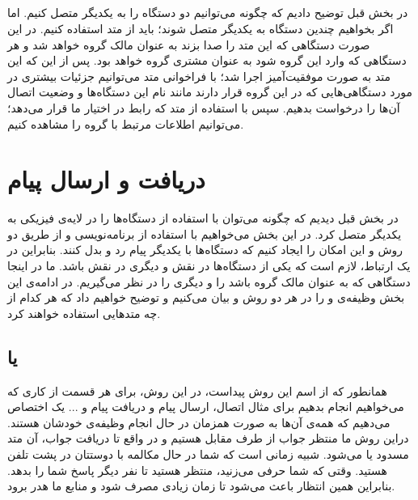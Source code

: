 \subsection{}
در بخش قبل توضیح دادیم که چگونه می‌توانیم دو دستگاه را به یکدیگر متصل کنیم. اما اگر بخواهیم چندین دستگاه به یکدیگر متصل شوند؛ باید از متد 
استفاده کنیم. در این صورت دستگاهی که این متد را صدا بزند به عنوان مالک گروه خواهد شد و هر دستگاهی که وارد این گروه شود به عنوان مشتری گروه خواهد بود. 
پس از این که این متد به صورت موفقیت‌آمیز اجرا شد؛ با فراخوانی متد
می‌توانیم جزئیات بیشتری در مورد دستگاهی‌هایی که در این گروه قرار دارند مانند نام این دستگاه‌ها و وضعیت اتصال آن‌ها را درخواست بدهیم. سپس با استفاده از متد
که رابط 
در اختیار ما قرار می‌دهد؛ می‌توانیم اطلاعات مرتبط با گروه را مشاهده کنیم.
\cite{wifidevelopers}

\section{دریافت و ارسال پیام}
در بخش قبل دیدیم که چگونه می‌توان با استفاده از 
دستگاه‌ها را در لایه‌ی فیزیکی به یکدیگر متصل کرد. در این بخش می‌خواهیم با استفاده از برنامه‌نویسی 
 و از طریق دو روش 
و 
این امکان را ایجاد کنیم که دستگاه‌ها با یکدیگر پیام رد و بدل کنند. بنابراین در یک ارتباط، لازم است که یکی از دستگاه‌ها در نقش
 و دیگری در نقش
 باشد. ما در اینجا دستگاهی که به عنوان مالک گروه باشد را 
و  دیگری را 
 در نظر می‌گیریم. در ادامه‌ی این بخش وظیفه‌ی 
و
را در هر دو روش
و 
بیان می‌کنیم و توضیح خواهیم داد که هر کدام از چه متد‌هایی استفاده خواهند کرد.
\subsection{ یا }
همانطور که از اسم این روش پیداست، در این روش، برای هر قسمت از  کاری که می‌خواهیم انجام بدهیم برای مثال اتصال، ارسال پیام و دریافت پیام و ... یک 
اختصاص می‌دهیم که همه‌ی آن‌ها به صورت همزمان در حال انجام وظیفه‌ی خودشان هستند. 
دراین روش  ما منتظر جواب از طرف مقابل هستیم و در واقع تا دریافت جواب، آن متد مسدود یا 
می‌شود. شبیه زمانی است که شما در حال مکالمه با دوستتان در پشت تلفن هستید. وقتی که شما حرفی می‌زنید، منتظر هستید تا نفر دیگر پاسخ شما را بدهد. بنابراین همین انتظار باعث می‌شود تا زمان زیادی مصرف شود و منابع ما هدر برود.

